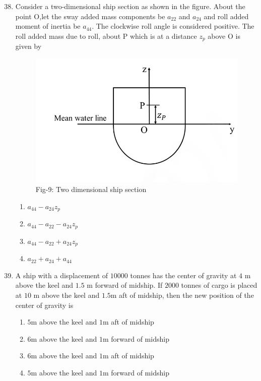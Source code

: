 \documentclass[journal]{IEEEtran}
\theoremstyle{remark}
\begin{document}
\begin{enumerate}[itemsep=1em]
\setcounter{enumi}{37}
\item Consider a two-dimensional ship section as shown in the figure. About the point O,let the sway added mass components be $a_{22}$ and $a_{24}$ and roll added moment of inertia be $a_{44}$. The clockwise roll angle is considered positive. The roll added mass due to roll, about P which is at a distance $z_p$ above O is given by 
\begin{figure}[H]
    \centering
    \includegraphics[width=0.5\columnwidth]{figs/fig-9.jpg}
    \caption*{Fig-9: Two dimensional ship section}
    \label{fig-9}
\end{figure}
\begin{multicols}{4}
\begin{enumerate}
       \item $a_{44}-a_{24}z_p$
       \item $a_{44}-a_{22}-a_{24}z_p$
       \item $a_{44}-a_{22}+a_{24}z_p$  
       \item $a_{22}+a_{24}+a_{44}$ 
\end{enumerate}
\end{multicols}


\end{enumerate}

\begin{enumerate}[itemsep=1em]
\setcounter{enumi}{38}
\item A ship with a displacement of $10000$ tonnes has the center of gravity at $4$ m above the keel and $1.5$ m forward of midship. If $2000$ tonnes of cargo is placed at $10$ m 
above the keel and $1.5$m aft of midship, then the new position of the center of gravity is

\begin{enumerate}[ leftmargin=2.5em, labelsep=0.5em, itemsep=0.5em]
       \item $5$m above the keel and $1$m aft of midship 
       \item $6$m above the keel and $1$m forward of midship 
       \item $6$m above the keel and $1$m aft of midship  
       \item $5$m above the keel and $1$m forward of midship 
\end{enumerate}
\end{enumerate}
\end{document}
